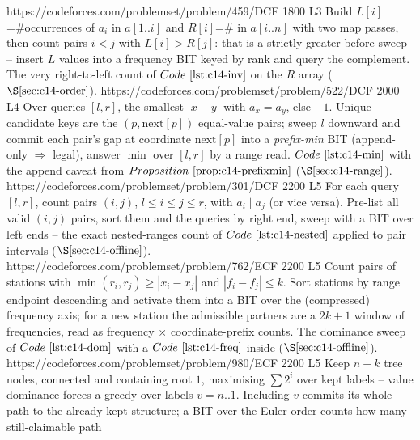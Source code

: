 \begin{mixedset}
    {https://codeforces.com/problemset/problem/459/D}{CF 1800 L3}
    {Build \(L[i]\)=\#occurrences of \(a_i\) in \(a[1..i]\) and \(R[i]\)=\# in
     \(a[i..n]\) with two map passes, then count pairs \(i<j\) with \(L[i]>R[j]\):
     that is a strictly-greater-before sweep -- insert \(L\) values into a
     frequency BIT keyed by rank and query the complement. The very
     right-to-left count of \(\coderef{c14-inv}\) on the \(R\) array
     (\(\secref{c14-order}\)).}
    {https://codeforces.com/problemset/problem/522/D}{CF 2000 L4}
    {Over queries \([l,r]\), the smallest \(|x-y|\) with \(a_x=a_y\), else \(-1\).
     Unique candidate keys are the \((p,\text{next}[p])\) equal-value pairs; sweep
     \(l\) downward and commit each pair's gap at coordinate \(\text{next}[p]\) into
     a \emph{prefix-min} BIT (append-only \(\Rightarrow\) legal), answer
     \(\min\) over \([l,r]\) by a range read. \(\coderef{c14-min}\) with the
     append caveat from \(\propref{c14-prefixmin}\) (\(\secref{c14-range}\)).}
    {https://codeforces.com/problemset/problem/301/D}{CF 2200 L5}
    {For each query \([l,r]\), count pairs \((i,j)\), \(l\le i\le j\le r\), with
     \(a_i\mid a_j\) (or vice versa). Pre-list all valid \((i,j)\) pairs, sort them
     and the queries by right end, sweep with a BIT over left ends -- the exact
     nested-ranges count of \(\coderef{c14-nested}\) applied to pair intervals
     (\(\secref{c14-offline}\)).}
    {https://codeforces.com/problemset/problem/762/E}{CF 2200 L5}
    {Count pairs of stations with \(\min(r_i,r_j)\ge|x_i-x_j|\) and
     \(|f_i-f_j|\le k\). Sort stations by range endpoint descending and activate
     them into a BIT over the (compressed) frequency axis; for a new station the
     admissible partners are a \(2k{+}1\) window of frequencies, read as frequency
     \(\times\) coordinate-prefix counts. The dominance sweep of
     \(\coderef{c14-dom}\) with a \(\coderef{c14-freq}\) inside
     (\(\secref{c14-offline}\)).}
    {https://codeforces.com/problemset/problem/980/E}{CF 2200 L5}
    {Keep \(n-k\) tree nodes, connected and containing root \(1\), maximising
     \(\sum 2^i\) over kept labels -- value dominance forces a greedy over
     labels \(v=n..1\). Including \(v\) commits its whole path to the already-kept
     structure; a BIT over the Euler order counts how many still-claimable path
}
\end{mixedset}
